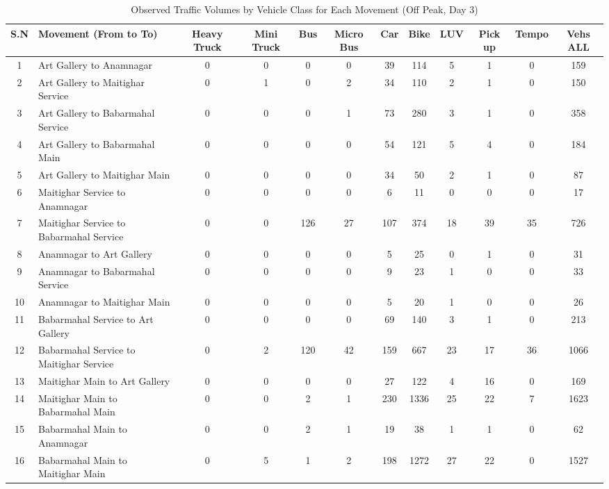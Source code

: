 \begin{landscape}
\begin{table}[h!]
\centering
\caption{Observed Traffic Volumes by Vehicle Class for Each Movement (Off Peak, Day 3)}
\small
\setlength{\tabcolsep}{5pt}
\begin{tabular}{|c|p{6cm}|c|c|c|c|c|c|c|c|c|c|}
\hline
S.N& Movement (From to To)& Heavy Truck & Mini Truck & Bus & Micro Bus & Car & Bike & LUV & Pick up & Tempo & Vehs ALL \\ \hline
1	&Art Gallery to Anamnagar	    &0	&0	&0	&0	&39	&114	&5	&1	&0	&159 \\ \hline
2	&Art Gallery to Maitighar Service	&0	&1	&0	&2	&34	&110	&2	&1	&0	&150 \\ \hline
3	&Art Gallery to Babarmahal Service	&0	&0	&0	&1	&73	&280	&3	&1	&0	&358 \\ \hline
4	&Art Gallery to Babarmahal Main	&0	&0	&0	&0	&54	&121	&5	&4	&0	&184 \\ \hline
5	&Art Gallery to Maitighar Main	&0	&0	&0	&0	&34	&50	&2	&1	&0	&87 \\ \hline
6	&Maitighar Service to Anamnagar	&0	&0	&0	&0	&6	&11	&0	&0	&0	&17 \\ \hline
7	&Maitighar Service to Babarmahal Service	&0	&0	&126	&27	&107	&374	&18	&39	&35	&726 \\ \hline
8	&Anamnagar to Art Gallery	&0	&0	&0	&0	&5	&25	&0	&1	&0	&31 \\ \hline
9	&Anamnagar to Babarmahal Service	&0	&0	&0	&0	&9	&23	&1	&0	&0	&33 \\ \hline
10	&Anamnagar to Maitighar Main	&0	&0	&0	&0	&5	&20	&1	&0	&0	&26 \\ \hline
11	&Babarmahal Service to Art Gallery	&0	&0	&0	&0	&69	&140	&3	&1	&0	&213 \\ \hline
12	&Babarmahal Service to Maitighar Service	&0	&2	&120	&42	&159	&667	&23	&17	&36	&1066 \\ \hline
13	&Maitighar Main to Art Gallery	&0	&0	&0	&0	&27	&122	&4	&16	&0	&169 \\ \hline
14	&Maitighar Main to Babarmahal Main	&0	&0	&2	&1	&230	&1336	&25	&22	&7	&1623 \\ \hline
15	&Babarmahal Main to Anamnagar	&0	&0	&2	&1	&19	&38	&1	&1	&0	&62 \\ \hline
16	&Babarmahal Main to Maitighar Main	&0	&5	&1	&2	&198	&1272	&27	&22	&0	&1527 \\ \hline

\end{tabular}
\end{table}
\end{landscape}


